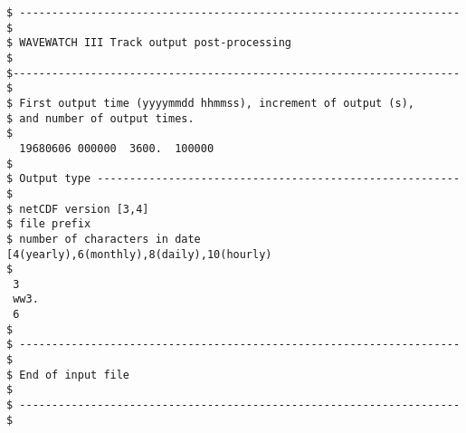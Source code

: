 \begin{footnotesize}
\begin{verbatim}
$ -------------------------------------------------------------------- $
$ WAVEWATCH III Track output post-processing                           $
$--------------------------------------------------------------------- $
$ First output time (yyyymmdd hhmmss), increment of output (s),
$ and number of output times.
$
  19680606 000000  3600.  100000
$
$ Output type -------------------------------------------------------- $
$ netCDF version [3,4]
$ file prefix
$ number of characters in date [4(yearly),6(monthly),8(daily),10(hourly)
$
 3
 ww3.
 6 
$
$ -------------------------------------------------------------------- $
$ End of input file                                                    $
$ -------------------------------------------------------------------- $
\end{verbatim}
\end{footnotesize}
